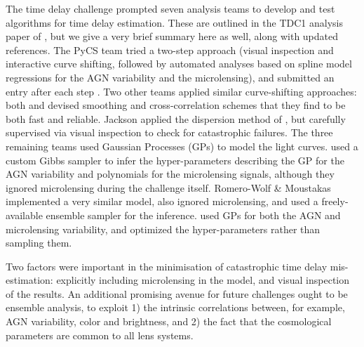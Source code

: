 The time delay challenge prompted seven analysis teams to develop and
test algorithms for time delay estimation. These are outlined in the
TDC1 analysis paper of \citet{LiaoEtal2015}, but we give a very brief
summary here as well, along with updated references.
The PyCS team tried a two-step approach (visual inspection and
interactive curve shifting, followed by automated analyses based on
spline model regressions for the AGN variability and the microlensing),
and submitted an entry after each step
\citep{BonvinEtal2016}. Two other teams applied similar
curve-shifting approaches: both \citet{A+S2015} and \citet{RK++2015}
devised smoothing and cross-correlation schemes that they find to be
both fast and reliable. Jackson applied the dispersion method of
\citet{Pelt++96}, but carefully supervised via visual inspection to
check for  catastrophic failures.  The three remaining teams used
Gaussian Processes (GPs) to model the light curves. \citet{TakEtal2016}
used a custom Gibbs sampler to infer the hyper-parameters describing the
GP for the AGN variability and polynomials for the microlensing signals,
although they ignored microlensing during the challenge itself.
Romero-Wolf \& Moustakas implemented a very similar model, also ignored
microlensing, and used a freely-available ensemble sampler for the
inference. \citet{H+L2014} used GPs for both the AGN and microlensing
variability, and optimized the hyper-parameters rather than sampling
them.

Two factors were important in the minimisation of catastrophic time
delay mis-estimation: explicitly including microlensing in the model,
and  visual inspection of the results. An additional promising avenue
for future challenges ought to be ensemble analysis, to exploit 1) the
intrinsic correlations between, for example, AGN variability, color and
brightness, and 2) the fact that  the cosmological parameters are common
to all lens systems.
